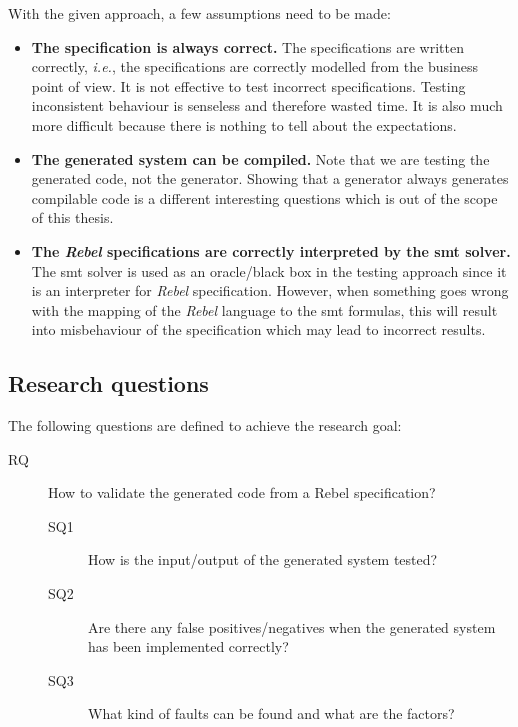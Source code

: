 With the given approach, a few assumptions need to be made:
\begin{itemize}
\item \textbf{The specification is always correct.}
The specifications are written correctly, \textit{i.e.}, the specifications are
correctly modelled from the business point of view.
It is not effective to test incorrect specifications. Testing
inconsistent behaviour is senseless and therefore wasted time. It is also much
more difficult because there is nothing to tell about the expectations.
\item \textbf{The generated system can be compiled.} Note that we are testing
the generated code, not the generator. Showing that a generator always generates
compilable code is a different interesting questions which is out of the scope
of this thesis.
\item \textbf{The \textit{Rebel} specifications are correctly interpreted by the \gls{smt}
solver.} The \gls{smt} solver is used as an oracle/black box in the testing approach
since it is an interpreter for \textit{Rebel} specification. However, when
something goes wrong with the mapping of the \textit{Rebel} language to the \gls{smt}
formulas, this will result into misbehaviour of the specification which may lead
to incorrect results.
\end{itemize}

\subsection{Research questions}\label{sec:research-questions}
The following questions are defined to achieve the research goal:

\begin{description}
  \item [RQ] How to validate the generated code from a Rebel specification?

  \begin{description}
    \item [SQ1] How is the input/output of the generated system tested?
    \item [SQ2] Are there any false positives/negatives when the generated
    system has been implemented correctly?
    \item [SQ3] What kind of faults can be found and what are the factors?
  \end{description}

\end{description}

